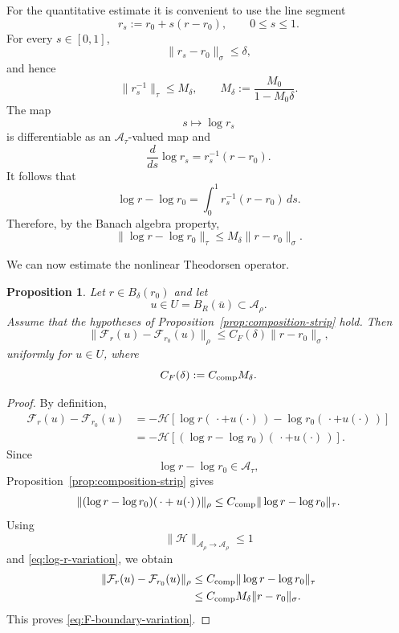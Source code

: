 \documentclass[11pt,a4paper]{amsart}
\newtheorem{proposition}[theorem]{Proposition}
\begin{document}
For the quantitative estimate it is convenient to use the line
segment
\[
r_s:=r_0+s(r-r_0),
\qquad
0\le s\le1.
\]
For every $s\in[0,1]$,
\[
\|r_s-r_0\|_\sigma
\le
\delta,
\]
and hence
\[
\|r_s^{-1}\|_\tau
\le
M_\delta,
\qquad
M_\delta
:=
\frac{M_0}{1-M_0\delta}.
\]
The map
\[
s\longmapsto \log r_s
\]
is differentiable as an $\mathcal A_\tau$-valued map and
\[
\frac{d}{ds}\log r_s
=
r_s^{-1}(r-r_0).
\]
It follows that
\[
\log r-\log r_0
=
\int_0^1
r_s^{-1}(r-r_0)\,ds.
\]
Therefore, by the Banach algebra property,
\begin{equation}\label{eq:log-r-variation}
	\|\log r-\log r_0\|_\tau
	\le
	M_\delta\|r-r_0\|_\sigma.
\end{equation}

We can now estimate the nonlinear Theodorsen operator.

\begin{proposition}\label{prop:F-boundary-variation}
	Let $r\in B_\delta(r_0)$ and let
	\[
	u\in U=B_R(\bar u)\subset\mathcal A_\rho.
	\]
	Assume that the hypotheses of
	Proposition~\ref{prop:composition-strip} hold. Then
	\begin{equation}\label{eq:F-boundary-variation}
		\|\mathcal F_r(u)-\mathcal F_{r_0}(u)\|_\rho
		\le
		C_F(\delta)\|r-r_0\|_\sigma,
	\end{equation}
	uniformly for $u\in U$, where
	\begin{equation}\label{eq:CF}
		C_F(\delta)
		:=
		C_{\rm comp}M_\delta.
	\end{equation}
\end{proposition}

\begin{proof}
	By definition,
	\[
	\begin{aligned}
		\mathcal F_r(u)-\mathcal F_{r_0}(u)
		&=
		-\mathcal H
		\left[
		\log r(\,\cdot+u(\cdot)\,)
		-
		\log r_0(\,\cdot+u(\cdot)\,)
		\right]
		\\
		&=
		-\mathcal H
		\left[
		(\log r-\log r_0)(\,\cdot+u(\cdot)\,)
		\right].
	\end{aligned}
	\]
	Since
	\[
	\log r-\log r_0\in\mathcal A_\tau,
	\]
	Proposition~\ref{prop:composition-strip} gives
	\[
	\|(\log r-\log r_0)(\,\cdot+u(\cdot)\,)\|_\rho
	\le
	C_{\rm comp}
	\|\log r-\log r_0\|_\tau.
	\]
	Using
	\[
	\|\mathcal H\|_{\mathcal A_\rho\to\mathcal A_\rho}\le1
	\]
	and \eqref{eq:log-r-variation}, we obtain
	\[
	\begin{aligned}
		\|\mathcal F_r(u)-\mathcal F_{r_0}(u)\|_\rho
		&\le
		C_{\rm comp}
		\|\log r-\log r_0\|_\tau
		\\
		&\le
		C_{\rm comp}M_\delta
		\|r-r_0\|_\sigma.
	\end{aligned}
	\]
	This proves \eqref{eq:F-boundary-variation}.
\end{proof}
\end{document}
